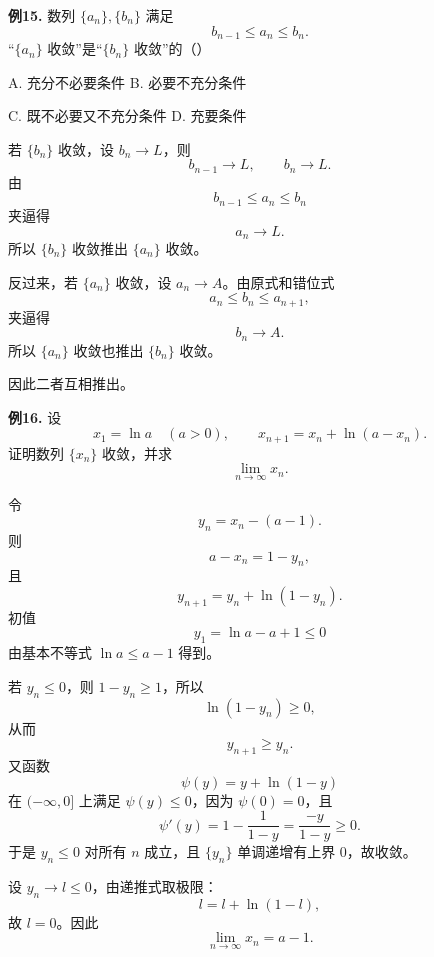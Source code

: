 \begin{problemblock}
\textbf{例15.} 数列 \(\{a_n\},\{b_n\}\) 满足
\[
b_{n-1}\le a_n\le b_n.
\]
“\(\{a_n\}\) 收敛”是“\(\{b_n\}\) 收敛”的（\quad）

A. 充分不必要条件 \qquad B. 必要不充分条件

C. 既不必要又不充分条件 \qquad D. 充要条件
\end{problemblock}

\begin{solutionblock}

若 \(\{b_n\}\) 收敛，设 \(b_n\to L\)，则
\[
b_{n-1}\to L,\qquad b_n\to L.
\]
由
\[
b_{n-1}\le a_n\le b_n
\]
夹逼得
\[
a_n\to L.
\]
所以 \(\{b_n\}\) 收敛推出 \(\{a_n\}\) 收敛。

反过来，若 \(\{a_n\}\) 收敛，设 \(a_n\to A\)。由原式和错位式
\[
a_n\le b_n\le a_{n+1},
\]
夹逼得
\[
b_n\to A.
\]
所以 \(\{a_n\}\) 收敛也推出 \(\{b_n\}\) 收敛。

因此二者互相推出。

\end{solutionblock}

\begin{problemblock}
\textbf{例16.} 设
\[
x_1=\ln a\quad(a>0),\qquad
x_{n+1}=x_n+\ln(a-x_n).
\]
证明数列 \(\{x_n\}\) 收敛，并求
\[
\lim_{n\to\infty}x_n.
\]
\end{problemblock}

\begin{solutionblock}

令
\[
y_n=x_n-(a-1).
\]
则
\[
a-x_n=1-y_n,
\]
且
\[
y_{n+1}=y_n+\ln(1-y_n).
\]
初值
\[
y_1=\ln a-a+1\le0
\]
由基本不等式 \(\ln a\le a-1\) 得到。

若 \(y_n\le0\)，则 \(1-y_n\ge1\)，所以
\[
\ln(1-y_n)\ge0,
\]
从而
\[
y_{n+1}\ge y_n.
\]
又函数
\[
\psi(y)=y+\ln(1-y)
\]
在 \((-\infty,0]\) 上满足 \(\psi(y)\le0\)，因为 \(\psi(0)=0\)，且
\[
\psi'(y)=1-\frac1{1-y}=\frac{-y}{1-y}\ge0.
\]
于是 \(y_n\le0\) 对所有 \(n\) 成立，且 \(\{y_n\}\) 单调递增有上界 0，故收敛。

设 \(y_n\to l\le0\)，由递推式取极限：
\[
l=l+\ln(1-l),
\]
故 \(l=0\)。因此
\[
\lim_{n\to\infty}x_n=a-1.
\]

\end{solutionblock}


